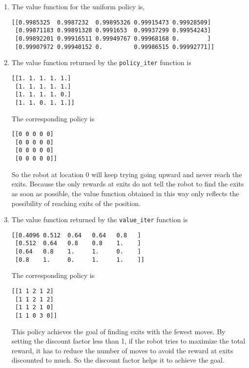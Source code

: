 \begin{enumerate}
  \item The value function for the uniform policy is,
  \begin{verbatim}
[[0.9985325  0.9987232  0.99895326 0.99915473 0.99928509]
 [0.99871183 0.99891328 0.9991653  0.99937299 0.99954243]
 [0.99892201 0.99916511 0.99949767 0.99968168 0.        ]
 [0.99907972 0.99940152 0.         0.99986515 0.99992771]]
 \end{verbatim}
  \item The value function returned by the \texttt{policy\_iter} function is
  \begin{verbatim}
[[1. 1. 1. 1. 1.]
 [1. 1. 1. 1. 1.]
 [1. 1. 1. 1. 0.]
 [1. 1. 0. 1. 1.]]
  \end{verbatim}
  The corresponding policy is
  \begin{verbatim}
[[0 0 0 0 0]
 [0 0 0 0 0]
 [0 0 0 0 0]
 [0 0 0 0 0]]
  \end{verbatim}
  So the robot at location 0 will keep trying going upward and
  never reach the exits. Because the only rewards at exits do
  not tell the robot to find the exits as soon as possible, the
  value function obtained in this way only reflects the possibility
  of reaching exits of the position.
  \item The value function returned by the \texttt{value\_iter}
  function is
  \begin{verbatim}
[[0.4096 0.512  0.64   0.64   0.8   ]
 [0.512  0.64   0.8    0.8    1.    ]
 [0.64   0.8    1.     1.     0.    ]
 [0.8    1.     0.     1.     1.    ]]
\end{verbatim}
  The corresponding policy is
  \begin{verbatim}
[[1 1 2 1 2]
 [1 1 2 1 2]
 [1 1 2 1 0]
 [1 1 0 3 0]]
  \end{verbatim}
  This policy achieves the goal of finding exits with the fewest
  moves. By setting the discount factor less than 1, if the robot
  tries to maximize the total reward, it has to reduce the number
  of moves to avoid the reward at exits discounted to much. So
  the discount factor helps it to achieve the goal.
\end{enumerate}
